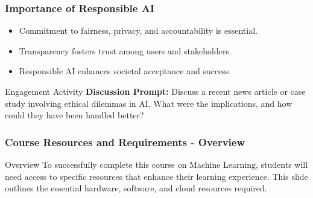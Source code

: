 \documentclass[aspectratio=169]{beamer}
\begin{document}
\begin{frame}[fragile]
  \frametitle{Importance of Responsible AI}
  \begin{itemize}
    \item Commitment to fairness, privacy, and accountability is essential.
    \item Transparency fosters trust among users and stakeholders.
    \item Responsible AI enhances societal acceptance and success.
  \end{itemize}
  \begin{block}{Engagement Activity}
    \textbf{Discussion Prompt:} Discuss a recent news article or case study involving ethical dilemmas in AI. What were the implications, and how could they have been handled better?
  \end{block}
\end{frame}

\begin{frame}[fragile]
    \frametitle{Course Resources and Requirements - Overview}
    \begin{block}{Overview}
        To successfully complete this course on Machine Learning, students will need access to specific resources that enhance their learning experience. This slide outlines the essential hardware, software, and cloud resources required.
    \end{block}
\end{frame}
\end{document}
